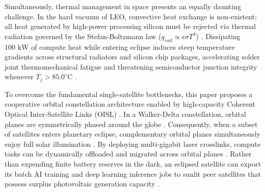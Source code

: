 \documentclass[journal]{IEEEtran}
\begin{document}
Simultaneously, thermal management in space presents an equally daunting challenge. In the hard vacuum of LEO, convective heat exchange is non-existent; all heat generated by high-power processing silicon must be rejected via thermal radiation governed by the Stefan-Boltzmann law ($q_{rad} \propto \epsilon \sigma T^4$) \cite{gilmore2002spacecraft, skadron2004temperature}. Dissipating $100\text{ kW}$ of compute heat while entering eclipse induces steep temperature gradients across structural radiators and silicon chip packages, accelerating solder joint thermomechanical fatigue and threatening semiconductor junction integrity whenever $T_j > 85.0^\circ\text{C}$ \cite{bartolini2013thermal, felix2024total, lentaris2018high}.

To overcome the fundamental single-satellite bottlenecks, this paper proposes a cooperative orbital constellation architecture enabled by high-capacity Coherent Optical Inter-Satellite Links (OISL) \cite{chaudhry2021laser, kaushal2017optical, artiga2025targeting, chaudhry2022optical}. In a Walker-Delta constellation, orbital planes are symmetrically phased around the globe \cite{walker1984satellite, delportillo2019technical}. Consequently, when a subset of satellites enters planetary eclipse, complementary orbital planes simultaneously enjoy full solar illumination \cite{kodheli2021satellite, alhraishawi2023survey}. By deploying multi-gigabit laser crosslinks, compute tasks can be dynamically offloaded and migrated across orbital planes \cite{bhattacherjee2019network, bhattacherjee2020inorbit, handley2018delay, zhu2022laser}. Rather than expending finite battery reserves in the dark, an eclipsed satellite can export its batch AI training and deep learning inference jobs to sunlit peer satellites that possess surplus photovoltaic generation capacity \cite{giuffrida2022phisat, wu2022dsfl, pfandzelter2022qos}.
\end{document}
